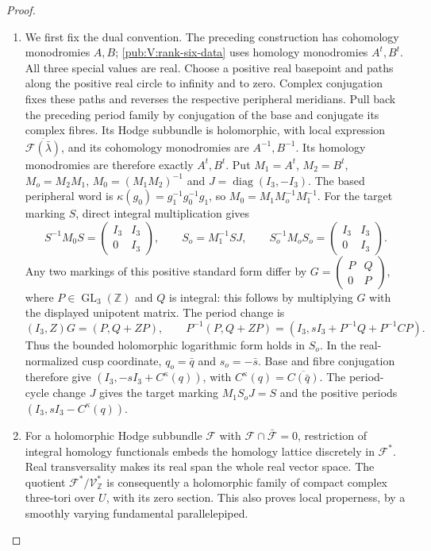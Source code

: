 \begin{proof}
\begin{enumerate}[label={$\langle1\rangle$\arabic*.}]
\item We first fix the dual convention.  The preceding construction
has cohomology monodromies $A,B$; \cref{pub:V:rank-six-data} uses homology
monodromies $A^t,B^t$.  All three special values are real.
Choose a positive real basepoint and paths along the positive
real circle to infinity and to zero.  Complex conjugation fixes
these paths and reverses the respective peripheral meridians.
Pull back the preceding period family by conjugation of the
base and conjugate its complex fibres.  Its Hodge subbundle is
holomorphic, with local expression
$\overline{\mathcal F(\bar\lambda)}$, and its cohomology
monodromies are $A^{-1},B^{-1}$.  Its homology monodromies are
therefore exactly $A^t,B^t$.
Put $M_1=A^t$, $M_2=B^t$, $M_o=M_2M_1$, $M_0=(M_1M_2)^{-1}$ and
$J=\operatorname{diag}(I_3,-I_3)$.  The based peripheral word is
$\kappa(g_0)=g_1^{-1}g_0^{-1}g_1$, so
$M_0=M_1M_o^{-1}M_1^{-1}$.  For the target marking $S$,
direct integral multiplication gives
\[
 S^{-1}M_0S=\begin{pmatrix}I_3&I_3\\0&I_3\end{pmatrix},\qquad
 S_o=M_1^{-1}SJ,\qquad
 S_o^{-1}M_oS_o=\begin{pmatrix}I_3&I_3\\0&I_3\end{pmatrix}.
\]
Any two markings of this positive standard form differ by
$G=\left(\begin{smallmatrix}P&Q\\0&P\end{smallmatrix}\right)$,
where $P\in\operatorname{GL}_3(\mathbb Z)$ and $Q$ is integral:
this follows by multiplying $G$ with the displayed unipotent
matrix.  The period change is
\[
 (I_3,Z)G=(P,Q+ZP),\qquad
 P^{-1}(P,Q+ZP)
  =(I_3,sI_3+P^{-1}Q+P^{-1}CP).
\]
Thus the bounded holomorphic logarithmic form holds in $S_o$.
In the real-normalized cusp coordinate,
$q_o=\bar q$ and $s_o=-\bar s$.
Base and fibre conjugation therefore give
$(I_3,-sI_3+C^\kappa(q))$, with
$C^\kappa(q)=\overline{C(\bar q)}$.
The period-cycle change $J$ gives the target marking
$M_1S_oJ=S$ and the positive periods
$(I_3,sI_3-C^\kappa(q))$.


\item For a holomorphic Hodge subbundle $\mathcal F$ with
$\mathcal F\cap\bar{\mathcal F}=0$, restriction of integral
homology functionals embeds the homology lattice discretely in
$\mathcal F^*$.  Real transversality makes its real span the
whole real vector space.  The quotient
$\mathcal F^*/\mathcal V_{\mathbb Z}^*$ is consequently a
holomorphic family of compact complex three-tori over $U$,
with its zero section.  This also proves local properness,
by a smoothly varying fundamental parallelepiped.


\end{enumerate}
\end{proof}
